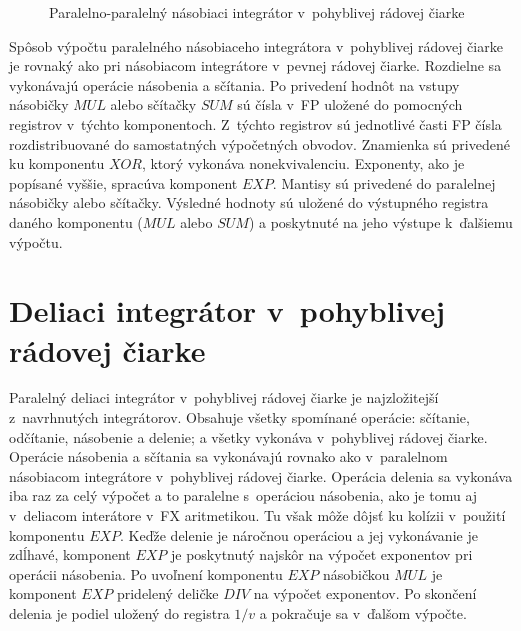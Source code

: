 \begin{figure}[h]
\centering
{}
\caption{Paralelno-paralelný násobiaci integrátor v~pohyblivej rádovej čiarke}
\label{ppni_fp}
\end{figure}
\bigskip

Spôsob výpočtu paralelného násobiaceho integrátora v~pohyblivej rádovej čiarke je rovnaký ako pri násobiacom integrátore v~pevnej rádovej čiarke. Rozdielne sa vykonávajú operácie násobenia a sčítania. Po privedení hodnôt na vstupy násobičky $ MUL $ alebo sčítačky $ SUM $ sú čísla v~FP uložené do pomocných registrov v~týchto komponentoch. Z~týchto registrov sú jednotlivé časti FP čísla rozdistribuované do samostatných výpočetných obvodov. Znamienka sú privedené ku komponentu $ XOR $, ktorý vykonáva nonekvivalenciu. Exponenty, ako je popísané vyššie, spracúva komponent $ EXP $. Mantisy sú privedené do paralelnej násobičky alebo sčítačky. Výsledné hodnoty sú uložené do výstupného registra daného komponentu ($ MUL $ alebo $ SUM $) a poskytnuté na jeho výstupe k~ďalšiemu výpočtu.

\section{Deliaci integrátor v~pohyblivej rádovej čiarke}
Paralelný deliaci integrátor v~pohyblivej rádovej čiarke je najzložitejší z~navrhnutých integrátorov. Obsahuje všetky spomínané operácie: sčítanie, odčítanie, násobenie a delenie; a všetky vykonáva v~pohyblivej rádovej čiarke.
Operácie násobenia a sčítania sa vykonávajú rovnako ako v~paralelnom násobiacom integrátore v~pohyblivej rádovej čiarke. Operácia delenia sa vykonáva iba raz za celý výpočet a to paralelne s~operáciou násobenia, ako je tomu aj v~deliacom interátore v~FX aritmetikou. Tu však môže dôjsť ku kolízii v~použití komponentu $ EXP $. Keďže delenie je náročnou operáciou a jej vykonávanie je zdĺhavé, komponent $ EXP $ je poskytnutý najskôr na výpočet exponentov pri operácii násobenia. Po uvoľnení komponentu $ EXP $ násobičkou $ MUL $ je komponent $ EXP $ pridelený deličke $ DIV $ na výpočet exponentov. Po skončení delenia je podiel uložený do registra $ 1/v $ a pokračuje sa v~ďalšom výpočte.


